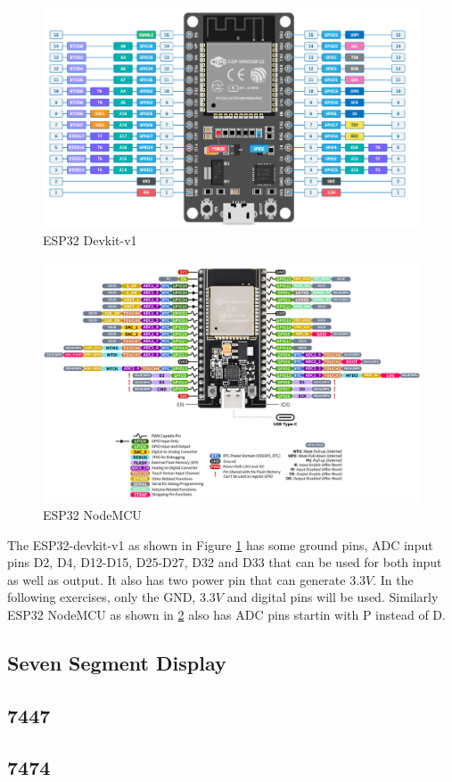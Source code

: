 \documentclass[journal]{IEEEtran}
\begin{document}
\begin{figure}[h]
    \centering
    \includegraphics[width=1\linewidth]{figs/esp32.png}
    \caption{ESP32 Devkit-v1}
    \label{fig:esp32}
\end{figure}
\begin{figure}[h]
    \centering
    \includegraphics[width=1\linewidth]{figs/nodeMCU.png}
    \caption{ESP32 NodeMCU}
    \label{fig:nodemcu}
\end{figure}
\par The ESP32-devkit-v1 as shown in Figure \ref{fig:esp32} has some ground pins, ADC input pins D2, D4, D12-D15, D25-D27, D32 and D33 that can be used for both input as well as output. It also has two power pin that can generate 3.3$V$.  In the following exercises, only the GND, 3.3$V$ and digital pins will be used. Similarly ESP32 NodeMCU as shown in \ref{fig:nodemcu} also has ADC pins startin with P instead of D.
\
\subsection{Seven Segment Display}


\subsection{7447}


\subsection{7474}

\end{document}
